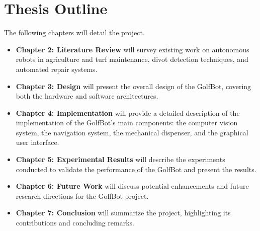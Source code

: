 \section{Thesis Outline}
The following chapters will detail the project.
\begin{itemize}
    \item \textbf{Chapter 2: Literature Review} will survey existing work on autonomous robots in agriculture and turf maintenance, divot detection techniques, and automated repair systems.
    \item \textbf{Chapter 3: Design} will present the overall design of the GolfBot, covering both the hardware and software architectures.
    \item \textbf{Chapter 4: Implementation} will provide a detailed description of the implementation of the GolfBot's main components: the computer vision system, the navigation system, the mechanical dispenser, and the graphical user interface.
    \item \textbf{Chapter 5: Experimental Results} will describe the experiments conducted to validate the performance of the GolfBot and present the results.
    \item \textbf{Chapter 6: Future Work} will discuss potential enhancements and future research directions for the GolfBot project.
    \item \textbf{Chapter 7: Conclusion} will summarize the project, highlighting its contributions and concluding remarks.
\end{itemize}